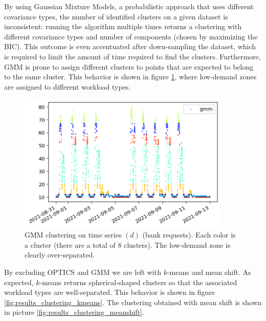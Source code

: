 \documentclass[a4paper, 12pt]{article} %
\begin{document}
	By using Gaussian Mixture Models, a probabilistic approach that uses different covariance types, the number of identified clusters on a given dataset is inconsistent: running the algorithm multiple times returns a clustering with different covariance types and number of components (chosen by maximizing the BIC). This outcome is even accentuated after down-sampling the dataset, which is required to limit the amount of time required to find the clusters. Furthermore, GMM is prone to assign different clusters to points that are expected to belong to the same cluster. This behavior is shown in figure \ref{fig:results_gmm}, where low-demand zones are assigned to different workload types.
	
	\begin{figure}
		\includegraphics[width=4in]{img/results_clustering_gmm.png}
		\caption{GMM clustering on time series $(d)$ (bank requests). Each color is a cluster (there are a total of 8 clusters). The low-demand zone is clearly over-separated.}
		\label{fig:results_gmm}
	\end{figure}

	By excluding OPTICS and GMM we are left with $k$-means and mean shift. As expected, $k$-means returns spherical-shaped clusters so that the associated workload types are well-separated. This behavior is shown in figure \ref{fig:results_clustering_kmeans}. The clustering obtained with mean shift is shown in picture \ref{fig:results_clustering_meanshift}.
	
\end{document}
